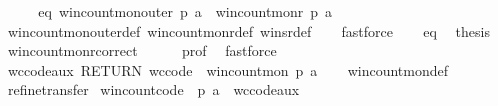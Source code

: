 \begin{isabellebody}
%
\isadelimproof
%
\endisadelimproof
%
\isatagproof
{}\isamarkupfalse%
\ {\isacharminus}{\kern0pt}\isanewline
\ \ \isamarkupfalse%
\ eq{\isacharcolon}{\kern0pt}\ {\isachardoublequoteopen}win{\isacharunderscore}{\kern0pt}count{\isacharunderscore}{\kern0pt}mon{\isacharunderscore}{\kern0pt}outer\ p\ a\ {\isacharequal}{\kern0pt}\ win{\isacharunderscore}{\kern0pt}count{\isacharunderscore}{\kern0pt}mon{\isacharunderscore}{\kern0pt}r\ p\ a{\isachardoublequoteclose}\isanewline
\ \ \isamarkupfalse%
\ win{\isacharunderscore}{\kern0pt}count{\isacharunderscore}{\kern0pt}mon{\isacharunderscore}{\kern0pt}outer{\isacharunderscore}{\kern0pt}def\ win{\isacharunderscore}{\kern0pt}count{\isacharunderscore}{\kern0pt}mon{\isacharunderscore}{\kern0pt}r{\isacharunderscore}{\kern0pt}def\ winsr{\isacharunderscore}{\kern0pt}def\isanewline
\ \ \isamarkupfalse%
\ fastforce\isanewline
\ \ \isamarkupfalse%
\ eq\ \isamarkupfalse%
\ {\isacharquery}{\kern0pt}thesis\ \isamarkupfalse%
\ win{\isacharunderscore}{\kern0pt}count{\isacharunderscore}{\kern0pt}mon{\isacharunderscore}{\kern0pt}r{\isacharunderscore}{\kern0pt}correct\isanewline
\ \ \ \ \isamarkupfalse%
\ prof\ \isamarkupfalse%
\ fastforce\ \isanewline
{}\isamarkupfalse%
%
\endisatagproof
{\isafoldproof}%
%
\isadelimproof
\isanewline
%
\endisadelimproof
\isanewline
{}\isamarkupfalse%
\ wc{\isacharunderscore}{\kern0pt}code{\isacharunderscore}{\kern0pt}aux{\isacharcolon}{\kern0pt}\ {\isachardoublequoteopen}RETURN\ {\isacharquery}{\kern0pt}wc{\isacharunderscore}{\kern0pt}code\ {\isasymle}\ win{\isacharunderscore}{\kern0pt}count{\isacharunderscore}{\kern0pt}mon\ p\ a{\isachardoublequoteclose}\isanewline
%
\isadelimproof
\ \ %
\endisadelimproof
%
\isatagproof
{}\isamarkupfalse%
\ win{\isacharunderscore}{\kern0pt}count{\isacharunderscore}{\kern0pt}mon{\isacharunderscore}{\kern0pt}def\isanewline
\ \ \isamarkupfalse%
\ {\isacharparenleft}{\kern0pt}refine{\isacharunderscore}{\kern0pt}transfer{\isacharparenright}{\kern0pt}%
\endisatagproof
{\isafoldproof}%
%
\isadelimproof
\isanewline
%
\endisadelimproof
\isanewline
{}\isamarkupfalse%
\ win{\isacharunderscore}{\kern0pt}count{\isacharunderscore}{\kern0pt}code\ \ p\ a\ \ wc{\isacharunderscore}{\kern0pt}code{\isacharunderscore}{\kern0pt}aux\isanewline

\end{isabellebody}

